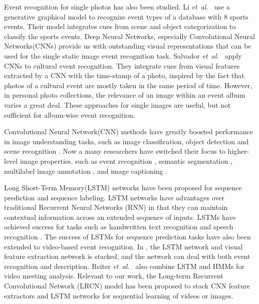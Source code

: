 \documentclass[runningheads]{llncs}
\newcommand{\etal}{\mbox{\emph{et al.\ }}}
\begin{document}
Event recognition for single photos has also been studied.  Li \etal \cite{what_where} use a generative graphical model to recognize event types of a database with 8 sports events. Their model integrates cues from scene and object categorization to classify the sports events. Deep Neural Networks, especially  Convolutional Neural Networks(CNNs) provide us with outstanding visual representations that can be used for the single static image event recognition task\cite{Park_2015_CVPR_Workshops, cSalvadora}. Salvador \etal\cite{cSalvadora} apply CNNs to cultural event recognition. They integrate cues from visual features extracted by a CNN with the time-stamp of a photo, inspired by the fact that photos of a cultural event are mostly taken in the same period of time. However, in personal photo collections, the relevance of an image within an event album varies a great deal. These approaches for single images are useful, but not sufficient for album-wise event recognition.
%
%
%
%
%
%

Convolutional Neural Network(CNN) methods have greatly boosted performance in image understanding tasks, such as image classification, object detection and scene recognition \cite{imagenet, googlenet, rcnn, places}. Now a many researchers have switched their focus to higher-level image properties, such as event recognition \cite{event_recognition}, semantic segmentation \cite{long_shelhamer_fcn},  multilabel image annotation \cite{tagging}, and image captioning \cite{lrcn}. 

Long Short-Term Memory(LSTM) networks \cite{lstm} have been proposed for sequence prediction and sequence labeling. LSTM networks have advantages over traditional Recurrent Neural Networks (RNN) in that they can maintain contextual information across  an extended sequence of inputs. LSTMs have achieved success for tasks such as handwritten text recognition \cite{Graves} and speech recognition \cite{speech}. 
The success of LSTMs for sequence prediction tasks have also been extended to video-based event recognition. In \cite{lstm}, the LSTM network and visual feature extraction network is stacked, and the network can deal with both event recognition and description. Reiter \etal \cite{lstm2} also combine LSTM and HMMs for video meeting analysis. Relevant to our work, the Long-term Recurrent Convolutional Network (LRCN) model \cite{lrcn} has been proposed to stack CNN feature extractors and LSTM networks for sequential learning of videos or images.
\end{document}
